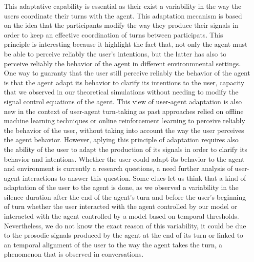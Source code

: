 This adaptative capability is essential as their exist a variability in the way the users coordinate their turns with the agent. This adaptation mecanism is based on the idea that the participants modify the way they produce their signals in order to keep an effective coordination of turns between participats. This principle is interesting because it highlight the fact that, not only the agent must be able to perceive reliably the user's intentions, but the latter has also to perceive reliably the behavior of the agent in different environmnental settings. One way to guaranty that the user still  perceive reliably the behavior of the agent is that the agent adapt its behavior to clarify its intentions to the user, capacity that we observed in our theoretical simulations without needing to modify the signal control equations of the agent. This view of user-agent adaptation is also new in the context of user-agent turn-taking as past approaches relied on offline machine learning techniques or online reinforcement learning to perceive reliably the behavior of the user, without taking into account the way the user perceives the agent behavior. 
However, aplying this principle of adaptation requires also the ability of the user to adapt the production of its signals in order to clarify its behavior and intentions. Whether the user could adapt its behavior to the agent and environment is currently a research questions, a need further analysis of user-agent interactions to answer this question. Some clues let us think that a kind of adaptation of the user to the agent is done, as we observed a variability in the silence duration after the end of the agent's turn and before the user's beginning of turn whether the user interacted with the agent controlled by our model or interacted with the agent controlled by a model based on temporal thresholds. Nevertheless, we do not know the exact reason of this variability, it could be due to the prosodic signals produced by the agent at the end of its turn or linked to an temporal alignment of the user to the way the agent takes the turn, a phenomenon that is observed in conversations. 

